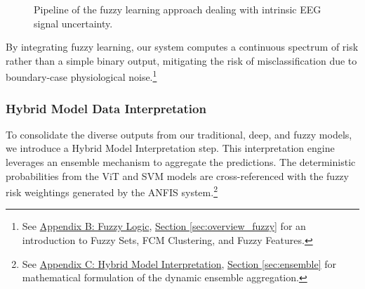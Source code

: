 \documentclass[openany]{book}
\begin{document}
\begin{figure}[htpb]
    \centering
    \caption{Pipeline of the fuzzy learning approach dealing with intrinsic EEG signal uncertainty.}
    \label{fig:fuzzy_learning}
\end{figure}

By integrating fuzzy learning, our system computes a continuous spectrum of risk rather than a simple binary output, mitigating the risk of misclassification due to boundary-case physiological noise.\footnote{See \hyperref[app:B]{Appendix B: Fuzzy Logic}, \hyperref[sec:overview_fuzzy]{Section \ref*{sec:overview_fuzzy}} for an introduction to Fuzzy Sets, FCM Clustering, and Fuzzy Features.}

\subsubsection{Hybrid Model Data Interpretation}
To consolidate the diverse outputs from our traditional, deep, and fuzzy models, we introduce a Hybrid Model Interpretation step. This interpretation engine leverages an ensemble mechanism to aggregate the predictions. The deterministic probabilities from the ViT and SVM models are cross-referenced with the fuzzy risk weightings generated by the ANFIS system.\footnote{See \hyperref[app:C]{Appendix C: Hybrid Model Interpretation}, \hyperref[sec:ensemble]{Section \ref*{sec:ensemble}} for mathematical formulation of the dynamic ensemble aggregation.}
\end{document}
